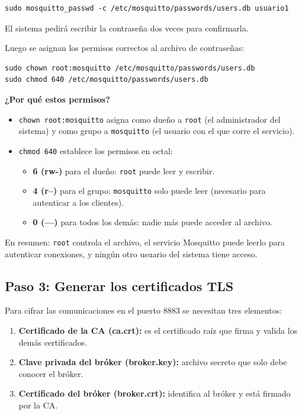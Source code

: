 \documentclass[12pt,a4paper]{article}
\begin{document}
\begin{lstlisting}[style=bash]
sudo mosquitto_passwd -c /etc/mosquitto/passwords/users.db usuario1
\end{lstlisting}

El sistema pedirá escribir la contraseña dos veces para confirmarla.

Luego se asignan los permisos correctos al archivo de contraseñas:

\begin{lstlisting}[style=bash]
sudo chown root:mosquitto /etc/mosquitto/passwords/users.db
sudo chmod 640 /etc/mosquitto/passwords/users.db
\end{lstlisting}

\textbf{¿Por qué estos permisos?}

\begin{itemize}
  \item \texttt{chown root:mosquitto} asigna como dueño a \texttt{root} (el
    administrador del sistema) y como grupo a \texttt{mosquitto} (el usuario
    con el que corre el servicio).
  \item \texttt{chmod 640} establece los permisos en octal:
    \begin{itemize}
      \item \textbf{6 (rw-)} para el dueño: \texttt{root} puede leer y escribir.
      \item \textbf{4 (r--)} para el grupo: \texttt{mosquitto} solo puede leer
        (necesario para autenticar a los clientes).
      \item \textbf{0 (---)} para todos los demás: nadie más puede acceder al
        archivo.
    \end{itemize}
\end{itemize}

En resumen: \texttt{root} controla el archivo, el servicio Mosquitto puede
leerlo para autenticar conexiones, y ningún otro usuario del sistema tiene
acceso.

\subsection{Paso 3: Generar los certificados TLS}

Para cifrar las comunicaciones en el puerto 8883 se necesitan tres elementos:

\begin{enumerate}
  \item \textbf{Certificado de la CA (ca.crt):} es el certificado raíz que
    firma y valida los demás certificados.
  \item \textbf{Clave privada del bróker (broker.key):} archivo secreto que
    solo debe conocer el bróker.
  \item \textbf{Certificado del bróker (broker.crt):} identifica al bróker y
    está firmado por la CA.
\end{enumerate}
\end{document}
